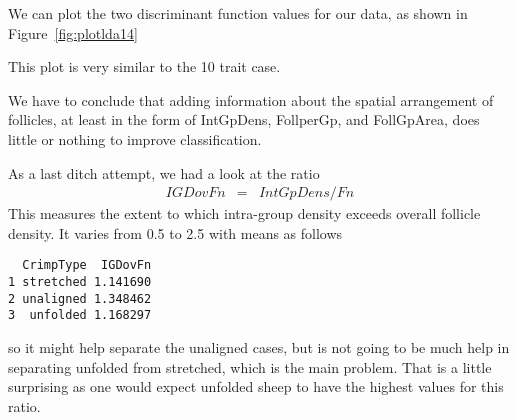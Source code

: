 \documentclass[titlepage]{article}  %
\begin{document}
We can plot the two discriminant function values for our data, as shown in Figure~\ref{fig:plotlda14}

This plot is very similar to the 10 trait case. 

We have to conclude that adding information about the spatial arrangement of follicles, at least in the form of IntGpDens, FollperGp, and FollGpArea, does little or nothing to improve classification.

As a last ditch attempt, we had a look at the ratio
\begin{eqnarray*}
IGDovFn & = & IntGpDens / Fn
\end{eqnarray*}
This measures the extent to which intra-group density exceeds overall follicle density. It varies from 0.5 to 2.5 with means as follows
\begin{verbatim}
  CrimpType  IGDovFn
1 stretched 1.141690
2 unaligned 1.348462
3  unfolded 1.168297
\end{verbatim}
so it might help separate the unaligned cases, but is not going to be much help in separating unfolded from stretched, which is the main problem. That is a little surprising as one would expect unfolded sheep to have the highest values for this ratio.
\end{document}
